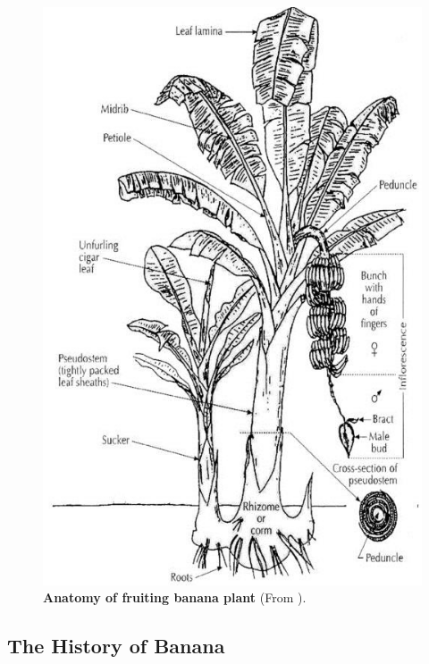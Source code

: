 

\begin{figure}[hp!]
    \centering
    \includegraphics[width=12cm]{Figures/Diagrammatic-representation-of-a-fruiting-banana-plant-with-suckers-in-Bakry-et-al_W640.jpg}
    \caption[Anatomy of fruiting banana plant]{\textbf{Anatomy of fruiting banana plant} (From \textcite{Bakry2009}).}
    \label{fig:Anatomy of fruiting banana plant}
\end{figure}
\clearpage

\subsection{The History of Banana}

